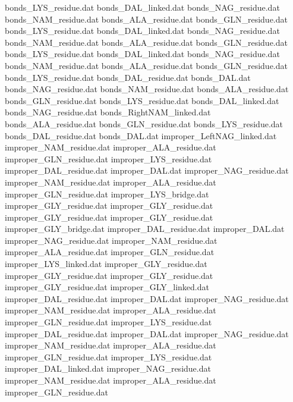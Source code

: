 bonds_LYS_residue.dat           
bonds_DAL_linked.dat            
bonds_NAG_residue.dat           
bonds_NAM_residue.dat           
bonds_ALA_residue.dat           
bonds_GLN_residue.dat           
bonds_LYS_residue.dat           
bonds_DAL_linked.dat            
bonds_NAG_residue.dat           
bonds_NAM_residue.dat           
bonds_ALA_residue.dat           
bonds_GLN_residue.dat           
bonds_LYS_residue.dat           
bonds_DAL_linked.dat            
bonds_NAG_residue.dat           
bonds_NAM_residue.dat           
bonds_ALA_residue.dat           
bonds_GLN_residue.dat           
bonds_LYS_residue.dat           
bonds_DAL_residue.dat           
bonds_DAL.dat                   
bonds_NAG_residue.dat           
bonds_NAM_residue.dat           
bonds_ALA_residue.dat           
bonds_GLN_residue.dat           
bonds_LYS_residue.dat           
bonds_DAL_linked.dat            
bonds_NAG_residue.dat           
bonds_RightNAM_linked.dat       
bonds_ALA_residue.dat           
bonds_GLN_residue.dat           
bonds_LYS_residue.dat           
bonds_DAL_residue.dat           
bonds_DAL.dat                   
improper_LeftNAG_linked.dat     
improper_NAM_residue.dat        
improper_ALA_residue.dat        
improper_GLN_residue.dat        
improper_LYS_residue.dat        
improper_DAL_residue.dat        
improper_DAL.dat                
improper_NAG_residue.dat        
improper_NAM_residue.dat        
improper_ALA_residue.dat        
improper_GLN_residue.dat        
improper_LYS_bridge.dat         
improper_GLY_residue.dat
improper_GLY_residue.dat
improper_GLY_residue.dat
improper_GLY_residue.dat
improper_GLY_bridge.dat
improper_DAL_residue.dat        
improper_DAL.dat                
improper_NAG_residue.dat        
improper_NAM_residue.dat        
improper_ALA_residue.dat        
improper_GLN_residue.dat        
improper_LYS_linked.dat         
improper_GLY_residue.dat
improper_GLY_residue.dat
improper_GLY_residue.dat
improper_GLY_residue.dat
improper_GLY_linked.dat
improper_DAL_residue.dat        
improper_DAL.dat                
improper_NAG_residue.dat        
improper_NAM_residue.dat        
improper_ALA_residue.dat        
improper_GLN_residue.dat        
improper_LYS_residue.dat        
improper_DAL_residue.dat        
improper_DAL.dat                
improper_NAG_residue.dat        
improper_NAM_residue.dat        
improper_ALA_residue.dat        
improper_GLN_residue.dat        
improper_LYS_residue.dat        
improper_DAL_linked.dat         
improper_NAG_residue.dat        
improper_NAM_residue.dat        
improper_ALA_residue.dat        
improper_GLN_residue.dat        
